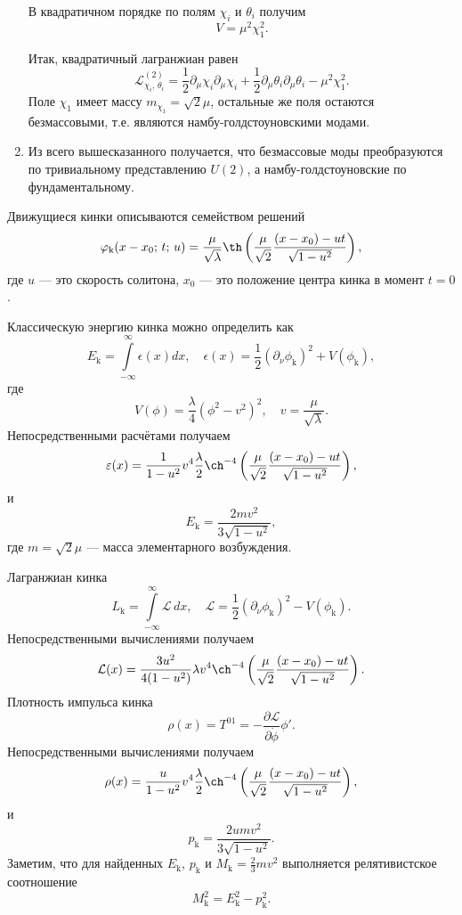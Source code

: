 \documentclass[a4paper]{article}
\begin{document}
\begin{sol}
\begin{enumerate}
В квадратичном порядке по полям $\chi_i$ и $\theta_i$ получим
 \[
V=\mu^2 \chi_1^2
.\] 

Итак, квадратичный лагранжиан равен
\[
	\mathcal{L}_{\chi_i,\,\theta_i}^{(2)}=\frac{1}{2}
	\partial_\mu \chi_i \partial_\mu \chi_i +
	\frac{1}{2} \partial_\mu \theta_i \partial_\mu \theta_i-
	\mu^2 \chi_1^2
.\] 
Поле $\chi_1$ имеет массу $m_{\chi_1}=\sqrt{2} \mu$, остальные
же поля остаются безмассовыми, т.\:е. являются намбу-голдстоуновскими модами.
\item Из всего вышесказанного получается, что безмассовые моды
	преобразуются по тривиальному представлению $U(2)$,
	а намбу-голдстоуновские по фундаментальному.
\end{enumerate}
\end{sol}
\begin{sol}
Движущиеся кинки описываются семейством решений
\[
	\phi_{\text{k}}(x-x_0;\,t;\, u)= \frac{\mu}{\sqrt{\lambda} }\th \left( \frac{\mu}{\sqrt{2} }\frac{(x-x_0)-ut}{\sqrt{1-u^2} } \right) 
,\] 
где $u$ --- это скорость солитона, $x_0$ --- это положение центра
кинка в момент $t=0$.

Классическую энергию кинка можно определить как
\[
	E_{\text{k}}= \int\limits_{-\infty}^{\infty}   \epsilon(x)dx,\quad \epsilon(x)=\frac{1}{2} (\partial_\nu \phi_{\text{k}})^2+V(\phi_{\text{k}}) 
,\] 
где 
\[
	V(\phi)=\frac{\lambda}{4}(\phi^2-v^2)^2,\quad
	v=\frac{\mu}{\sqrt{\lambda} }
.\] 
Непосредственными расчётами получаем
\[
	\epsilon(x)=\frac{1}{1-u^2} v^4\frac{\lambda}{2}\ch^{-4}\left( 
	\frac{\mu}{\sqrt{2} } \frac{(x-x_0)-ut}{\sqrt{1-u^2} }\right)
,\] 
и
\[
	E_{\text{k}}=\frac{2mv^2}{3\sqrt{1-u^2} }
,\] 
где $m=\sqrt{2} \mu$ --- масса элементарного возбуждения.

Лагранжиан кинка
\[
	L_{\text{k}}=\int\limits_{-\infty}^{\infty} \mathcal{L}\,dx,\quad
	\mathcal{L}=\frac{1}{2}(\partial_{\nu}\phi_{\text{k}})^2
	-V(\phi_{\text{k}})
.\] 
Непосредственными вычислениями получаем
\[
	\mathcal{L}(x)=\frac{3u^2}{4(1-u^2)}\lambda v^4\ch^{-4}\left( 
	\frac{\mu}{\sqrt{2} } \frac{(x-x_0)-ut}{\sqrt{1-u^2} }\right)
.\]
Плотность импульса кинка
\[
	\rho(x)= T^{01}=- \frac{\partial \mathcal{L}}{\partial
	\dot{\phi}}\phi' 
.\] 
Непосредственными вычислениями получаем
\[
	\rho(x)=\frac{u}{1-u^2} v^4\frac{\lambda}{2}\ch^{-4}\left( 
	\frac{\mu}{\sqrt{2} } \frac{(x-x_0)-ut}{\sqrt{1-u^2} }\right)
,\]
и
\[
p_\text{k}=\frac{2umv^2}{3\sqrt{1-u^2} }
.\] 
Заметим, что для найденных $E_{\text{k}}$, $p_\text{k}$ и
$M_\text{k}=\frac{2}{3}mv^2$ выполняется релятивистское
соотношение
\[
M_\text{k}^2=E_\text{k}^2-p_\text{k}^2
.\] 
\end{sol}
\end{document}
